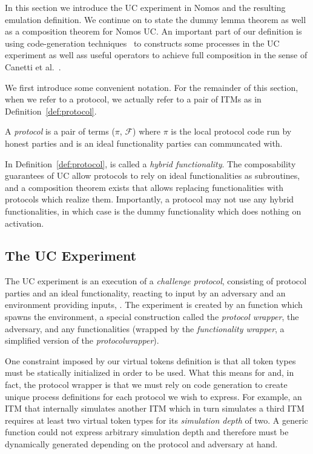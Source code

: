In this section we introduce the UC experiment in Nomos and the resulting emulation definition.
We continue on to state the dummy lemma theorem as well as a composition theorem for Nomos UC.
An important part of our definition is using code-generation techniques~\cite{somecodegeneration} to constructs some processes in the UC experiment as well ass useful operators to achieve full composition in the sense of Canetti et al.~\cite{uc}.


We first introduce some convenient notation.
For the remainder of this section, when we refer to a protocol, we actually refer to a pair of ITMs as in Definition~\ref{def:protocol}.
\begin{definition}\label{def:protocol}
A \textit{protocol} is a pair of terms ($\pi$, $\mathcal{F}$) where $\pi$ is the local protocol code run by honest parties and \F is an ideal functionality parties can communcated with.
\end{definition}
In Definition~\ref{def:protocol}, \F is called a \textit{hybrid functionality}. 
The composability guarantees of UC allow protocols to rely on ideal functionalities as subroutines, and a composition theorem exists that allows replacing functionalities with protocols which realize them.
Importantly, a protocol may not use any hybrid functionalities, in which case \F is the dummy functionality which does nothing on activation. 


\subsection{The UC Experiment}
The UC experiment is an execution of a \textit{challenge protocol}, consisting of protocol parties and an ideal functionality, reacting to input by an adversary \Adversary and an environment providing inputs, \Environment. 
The experiment is created by an  function which spawns the environment, a special construction called the \textit{protocol wrapper}, the adversary, and any functionalities (wrapped by the \textit{functionality wrapper}, a simplified version of the \textit{protocolwrapper}).

One constraint imposed by our virtual tokens definition is that all token types must be statically initialized in order to be used. 
What this means for  and, in fact, the protocol wrapper is that we must rely on code generation to create unique process definitions for each protocol we wish to express.
For example, an ITM that internally simulates another ITM which in turn simulates a third ITM requires at least two virtual token types for its \textit{simulation depth} of two. 
A generic  function could not express arbitrary simulation depth and therefore must be dynamically generated depending on the protocol and adversary at hand. 

